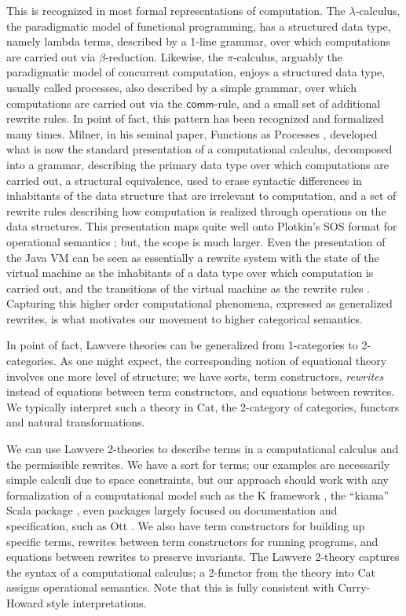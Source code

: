 \documentclass{llncs}
\begin{document}
  This is recognized in most formal representations of
  computation. The $\lambda$-calculus, the paradigmatic model of
  functional programming, has a structured data type, namely lambda
  terms, described by a 1-line grammar, over which computations are
  carried out via $\beta$-reduction. Likewise, the $\pi$-calculus,
  arguably the paradigmatic model of concurrent computation, enjoys a
  structured data type, usually called processes, also described by a
  simple grammar, over which computations are carried out via the
  $\mathsf{comm}$-rule, and a small set of additional rewrite
  rules. In point of fact, this pattern has been recognized and
  formalized many times. Milner, in his seminal paper, Functions as
  Processes \cite{DBLP:journals/mscs/Milner92}, developed what is now
  the standard presentation of a computational calculus, decomposed
  into a grammar, describing the primary data type over which
  computations are carried out, a structural equivalence, used to
  erase syntactic differences in inhabitants of the data structure
  that are irrelevant to computation, and a set of rewrite rules
  describing how computation is realized through operations on the
  data structures. This presentation maps quite well onto Plotkin's
  SOS format for operational semantics \cite{Plotkin04theorigins};
  but, the scope is much larger. Even the presentation of the Java VM
  can be seen as essentially a rewrite system with the state of the
  virtual machine as the inhabitants of a data type over which
  computation is carried out, and the transitions of the virtual
  machine as the rewrite rules
  \cite{DBLP:conf/oopsla/IgarashiPW99}. Capturing this higher order
  computational phenomena, expressed as generalized rewrites, is what
  motivates our movement to higher categorical semantics.

  In point of fact, Lawvere theories can be generalized from
  1-categories to 2-categories.  As one might expect, the
  corresponding notion of equational theory involves one more level of
  structure; we have sorts, term constructors, {\em rewrites} instead
  of equations between term constructors, and equations between
  rewrites.  We typically interpret such a theory in Cat, the
  2-category of categories, functors and natural transformations.

  We can use Lawvere 2-theories to describe terms in a computational
  calculus and the permissible rewrites.  We have a sort for terms;
  our examples are necessarily simple calculi due to space
  constraints, but our approach should work with any formalization of
  a computational model such as the K framework \cite{DBLP:journals/jlp/RosuS10}, the
  ``kiama'' Scala package \cite{DBLP:conf/gttse/Sloane09}, even packages largely focused
  on documentation and specification, such as Ott
  \cite{DBLP:journals/jfp/SewellNOPRSS10}.  We also have term
  constructors for building up specific terms, rewrites between term
  constructors for running programs, and equations between rewrites to
  preserve invariants.  The Lawvere 2-theory captures the syntax of a
  computational calculus; a 2-functor from the theory into Cat assigns
  operational semantics. Note that this is fully consistent with
  Curry-Howard style interpretations.
\end{document}
